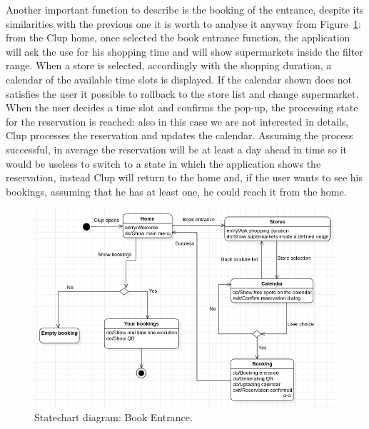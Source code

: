 Another important function to describe is the booking of the entrance, despite its similarities with the previous one it is worth to analyse it anyway from Figure~\ref{fig:BookEntr}: from the Clup home, once selected the book entrance function, the application will ask the use for his shopping time and will show supermarkets inside the filter range. When a store is selected, accordingly with the shopping duration, a calendar of the available time slots is displayed. If the calendar shown does not satisfies the user it possible to rollback to the store list and change supermarket. When the user decides a time slot and confirms the pop-up, the processing state for the reservation is reached: also in this case we are not interested in details, Clup processes the reservation and updates the calendar. Assuming the process successful, in average the reservation will be at least a day ahead in time so it would be useless to switch to a state in which the application shows the reservation, instead Clup will return to the home and, if the user wants to see his bookings, assuming that he has at least one, he could reach it from the home.  

\begin{figure}
	\includegraphics[width=\linewidth]{../Diagrams/BookEntrance.png}
	\caption{Statechart diagram: Book Entrance.}
	\label{fig:BookEntr}
\end{figure} 

